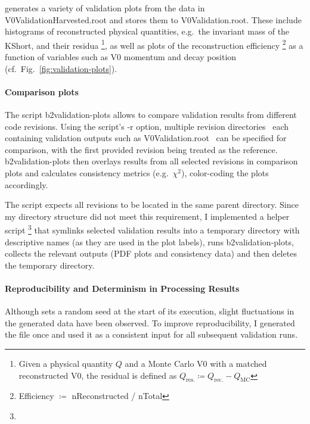{\genPlots \cite{v0ValidationCreatePlots} generates a variety of validation plots from
the data in V0ValidationHarvested.root and stores them to V0Validation.root.
These include histograms of reconstructed physical quantities, e.g.\ the invariant mass of the KShort, and their residua%
\footnote{%
  Given a physical quantity $Q$ and a Monte Carlo V0 with a matched reconstructed V0, the residual is defined as $Q_\text{res.} \coloneq Q_\text{rec.} - Q_\text{MC}$
},
as well as plots of the reconstruction efficiency%
\footnote{Efficiency $\coloneq$ nReconstructed / nTotal}
as a function of variables such as V0 momentum and decay position (cf.\ Fig.\ \ref{fig:validation-plots}).

\paragraph{Comparison plots}
The script b2validation-plots \cite{b2validation-plots} allows to compare validation results from different code revisions.
Using the script's -r option, multiple revision directories \textemdash\ each containing validation outputs such as V0Validation.root \textemdash\ can be specified for comparison, with the first provided revision being treated as the reference.
b2validation-plots then overlays results from all selected revisions in comparison plots and calculates consistency metrics (e.g.\ $\chi^2$), color-coding the plots accordingly.

The script expects all revisions to be located in the same parent directory.
Since my directory structure did not meet this requirement, I implemented a helper script%
\footnote{%
}
that symlinks selected validation results into a temporary directory with descriptive names (as they are used in the plot labels), runs b2validation-plots, collects the relevant outputs (PDF plots and consistency data) and then deletes the temporary directory.

\paragraph{Reproducibility and Determinism in Processing Results}
Although \genSim sets a random seed at the start of its execution, slight fluctuations in the generated data have been observed.
To improve reproducibility, I generated the \genSimRoot file once and used it as a consistent input for all subsequent validation runs.

}
